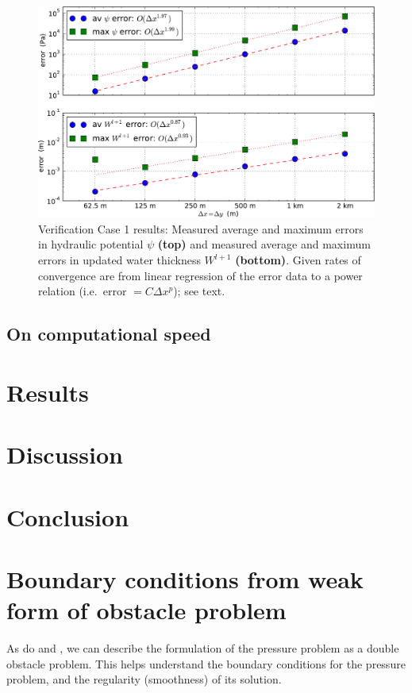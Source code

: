 \documentclass[11pt]{amsart}
\begin{document}
\begin{figure}[ht]
\centering
\includegraphics[width=5.5in,keepaspectratio=true]{figs/convergecase1}
\caption{Verification Case 1 results:  Measured average and maximum errors in hydraulic potential $\psi$ \textbf{(top)} and measured average and maximum errors in updated water thickness $W^{l+1}$ \textbf{(bottom)}.  Given rates of convergence are from linear regression of the error data to a power relation (i.e.~error $= C \Delta x^p$); see text.}
\label{fig:convergecase1}
\end{figure}

\subsection*{On computational speed}

\section{Results}


\section{Discussion}


\section{Conclusion}



\small


\appendix

\section{Boundary conditions from weak form of obstacle problem}  As do \cite{Schoofetal2012} and \cite{Hewittetal2012}, we can describe the formulation of the pressure problem as a double obstacle problem.  This helps understand the boundary conditions for the pressure problem, and the regularity (smoothness) of its solution.
\end{document}
